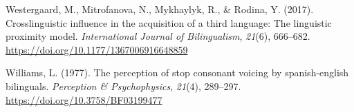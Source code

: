 \documentclass[
  man,floatsintext]{apa6}
\newlength{\cslhangindent}
\newlength{\cslentryspacingunit} %
\newenvironment{CSLReferences}[2] %
 {%
  \setlength{\parindent}{0pt}
  \ifodd #1
  \let\oldpar\par
  \def\par{\hangindent=\cslhangindent\oldpar}
  \fi
  \setlength{\parskip}{#2\cslentryspacingunit}
 }%
 {}
\begin{document}
\begin{CSLReferences}{1}{0}
\leavevmode{}%
Westergaard, M., Mitrofanova, N., Mykhaylyk, R., \& Rodina, Y. (2017). Crosslinguistic influence in the acquisition of a third language: The linguistic proximity model. \emph{International Journal of Bilingualism}, \emph{21}(6), 666--682. \url{https://doi.org/10.1177/1367006916648859}

\leavevmode{}%
Williams, L. (1977). The perception of stop consonant voicing by spanish-english bilinguals. \emph{Perception \& Psychophysics}, \emph{21}(4), 289--297. \url{https://doi.org/10.3758/BF03199477}

\end{CSLReferences}
\end{document}
